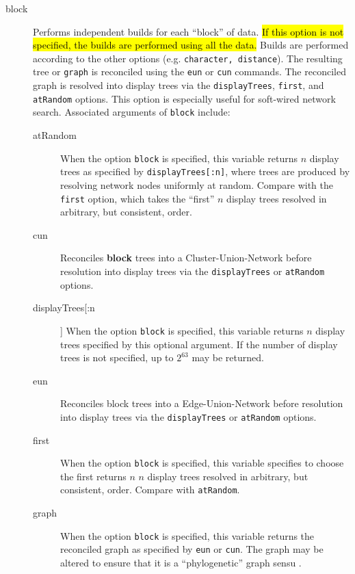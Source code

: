 	\begin{description}

		\item[block] Performs independent builds for each ``block'' of data. \hl{If this option 
		is not specified, the builds are performed using all the data.} Builds are performed 
		according 	to the other options (e.g. \texttt{character, distance}). The resulting tree 
		or \texttt{graph} is reconciled using the \texttt{eun} or \texttt{cun} commands. The 
		reconciled graph is resolved into display trees via the \texttt{displayTrees}, \texttt{first}, 
		and \texttt{atRandom} options. This option is especially useful for soft-wired network search. 
		Associated arguments of \texttt{block} include:
				
		\begin{description}
			\item[atRandom] When the option \texttt{block} is specified, this variable returns $n$ 
			display trees as specified by \texttt{displayTrees[:n]}, where trees are produced by 
			resolving network nodes uniformly at random. Compare with the \texttt{first} option, 
			which takes the ``first'' $n$ display trees resolved in arbitrary, but consistent, order.

			\item[cun] Reconciles \textbf {block} trees into a Cluster-Union-Network \citep{Baroni2005} 
			before resolution into display trees via the \texttt{displayTrees} or \texttt{atRandom} 
			options.
	
			\item[displayTrees[:n]] When the option \texttt{block} is specified, this variable 
			returns $n$ display trees specified by this optional argument. If the number of 
			display trees is not specified, up to $2^{63}$ may be returned.

			\item[eun] Reconciles block trees into a Edge-Union-Network \citep{MiyagiandWheeler2019, 
			Wheeler2022} before resolution into display trees via the \texttt{displayTrees} or 
			\texttt{atRandom} 
			options.

			\item[first] When the option \texttt{block} is specified, this variable specifies to 
			choose the first returns $n$ $n$ display trees resolved in arbitrary, but consistent, 
			order. Compare with 	\texttt{atRandom}.
			
			\item[graph] When the option \texttt{block} is specified, this variable returns the 
			reconciled graph as specified by \texttt{eun} or \texttt{cun}. The graph may be 
			altered to ensure that it is a ``phylogenetic'' graph sensu \cite{Moretetal2005}.
		\end{description}			
		

\end{description}

